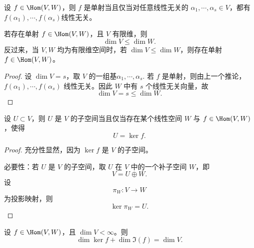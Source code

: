 \begin{corollary}
	设 $f\in\Hom(V,W)$，则 $f$ 是单射当且仅当对任意线性无关的
	$\alpha_1,\cdots,\alpha_s\in V$，都有$f(\alpha_1),\cdots,f(\alpha_s) $线性无关。
\end{corollary}
\begin{corollary}
	若存在单射 $f\in\Hom(V,W)$，且 $V$ 有限维，则
	\[
	\dim V\leq \dim W.
	\]
	反过来，当 $V,W$ 均为有限维空间时，若 $\dim V\leq \dim W$，则存在单射
	$f\in\Hom(V,W)$。
\end{corollary}

\begin{proof}
	设 $\dim V=s$，取 $V$ 的一组基$\alpha_1,\cdots,\alpha_s. $
	若 $f$ 是单射，则由上一个推论，$ f(\alpha_1),\cdots,f(\alpha_s)$
	线性无关。因此 $W$ 中有 $s$ 个线性无关向量，故
	\[
	\dim V=s\leq \dim W.
	\]
\end{proof}

\begin{corollary}
	设 $U\subset V$，则 $U$ 是 $V$ 的子空间当且仅当存在某个线性空间 $W$ 与
	$f\in\Hom(V,W)$，使得
	\[
	U=\ker f.
	\]
\end{corollary}

\begin{proof}
	充分性显然，因为 $\ker f$ 是 $V$ 的子空间。
	
	必要性：若 $U$ 是 $V$ 的子空间，取 $U$ 在 $V$ 中的一个补子空间 $W$，即
	\[
	V=U\oplus W.
	\]
	设
	\[
	\pi_W:V\longrightarrow W
	\]
	为投影映射，则
	\[
	\ker \pi_W=U.
	\]
\end{proof}

\begin{theorem}
	设 $f\in\Hom(V,W)$，且 $\dim V<\infty$。则
	\[
	\dim\ker f+\dim\Im(f)=\dim V.
	\]
\end{theorem}

